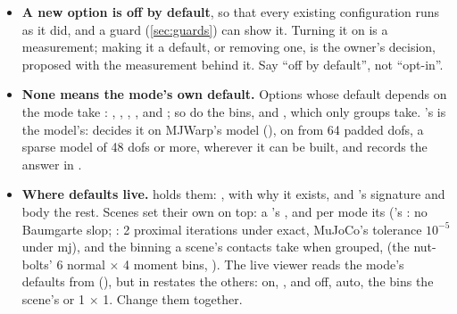 \begin{itemize}
\item \textbf{A new option is off by default}, so that every existing configuration runs as it did, and a guard (\cref{sec:guards}) can show it. Turning it on is a measurement; making it a default, or removing one, is the owner's decision, proposed with the measurement behind it. Say ``off by default'', not ``opt-in''.
\item \textbf{None means the mode's own default.} Options whose default depends on the mode take : , , , ,  and ; so do the bins,  and , which only groups take. 's  is the model's:  decides it on MJWarp's model (), on from 64 padded dofs, a sparse model of 48 dofs or more, wherever it can be built, and records the answer in .
\item \textbf{Where defaults live.}  holds them: , with why it exists, and 's signature and body the rest. Scenes set their own on top: a 's , and per mode its  ('s : no Baumgarte slop; : 2 proximal iterations under exact, MuJoCo's tolerance $10^{-5}$ under mj), and the binning a scene's contacts take when grouped,  (the nut-bolts' 6 normal $\times$ 4 moment bins, ). The live viewer reads the mode's defaults from  (), but  in  restates the others:  on, ,  and  off,  auto, the bins the scene's or 1 $\times$ 1. Change them together.
\end{itemize}


